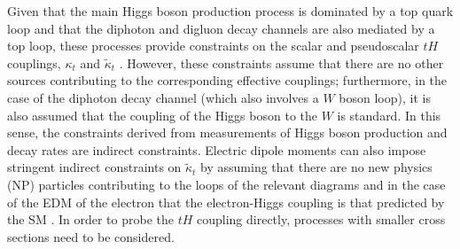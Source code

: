 \documentclass[aps,preprint,tightenlines,floatfix,superscriptaddress,nofootinbib,showpacs]{revtex4-1}
\def\kp{\kappa_t}
\def\kpt{\tilde{\kappa}_t}
\begin{document}
Given that the main Higgs boson production
process is dominated by a top quark loop and that
the diphoton and digluon decay channels are also mediated by a top
loop, these processes provide constraints on the scalar and
pseudoscalar $tH$ couplings, $\kp$ and $\kpt$
\cite{constraints1,constraints2, constraints3,constraints4}.
     However,
these constraints assume that there are no other sources contributing
to the corresponding effective couplings; furthermore, in the case of the
diphoton decay channel (which also involves a $W$ boson loop), it is also
assumed that the
coupling of the Higgs boson to the $W$ is standard. In this sense, the
constraints derived from measurements of Higgs boson production and decay rates
 are indirect constraints. Electric dipole moments can also
impose stringent indirect constraints on $\kpt$ by assuming that there
are no new physics (NP) particles contributing to the loops of the
relevant diagrams and in the case of the EDM of the electron that the 
electron-Higgs coupling is that
predicted by the SM \cite{constraints1,edm}. In order to probe
the $tH$ coupling directly, processes with smaller cross sections need
to be considered.  \par
\end{document}

